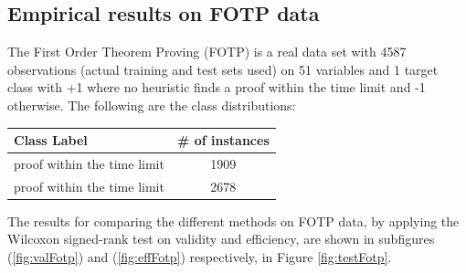 \documentclass[main]{subfiles}
\begin{document}
\subsection{Empirical results on FOTP data}
The First Order Theorem Proving (FOTP) is a real data set with 4587 observations (actual training and test sets used) on 51 variables and 1 target class with +1 where no heuristic finds a   proof within the time limit and -1 otherwise.  The following are the class distributions:

\begin{center}

\begin{tabular}{l|c}
Class Label & \# of instances \\
\toprule
proof within the time limit &  1909\\
proof within the time limit &  2678\\
\end{tabular}
\end{center}

The results for comparing the different methods on FOTP data, by applying the Wilcoxon signed-rank test on validity and efficiency, are shown in subfigures (\ref{fig:valFotp}) and (\ref{fig:effFotp}) respectively, in Figure \ref{fig:testFotp}.
\end{document}
